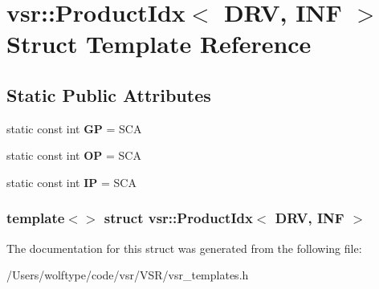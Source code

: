 \hypertarget{structvsr_1_1_product_idx_3_01_d_r_v_00_01_i_n_f_01_4}{\section{vsr\-:\-:Product\-Idx$<$ D\-R\-V, I\-N\-F $>$ Struct Template Reference}
\label{structvsr_1_1_product_idx_3_01_d_r_v_00_01_i_n_f_01_4}
}
\subsection*{Static Public Attributes}
\begin{DoxyCompactItemize}
\item 
\hypertarget{structvsr_1_1_product_idx_3_01_d_r_v_00_01_i_n_f_01_4_ac575700c460ca98326ea71cb839e7f89}{static const int {\bfseries G\-P} = S\-C\-A}\label{structvsr_1_1_product_idx_3_01_d_r_v_00_01_i_n_f_01_4_ac575700c460ca98326ea71cb839e7f89}

\item 
\hypertarget{structvsr_1_1_product_idx_3_01_d_r_v_00_01_i_n_f_01_4_af97c670a5023fd972c28977c0c50e6af}{static const int {\bfseries O\-P} = S\-C\-A}\label{structvsr_1_1_product_idx_3_01_d_r_v_00_01_i_n_f_01_4_af97c670a5023fd972c28977c0c50e6af}

\item 
\hypertarget{structvsr_1_1_product_idx_3_01_d_r_v_00_01_i_n_f_01_4_a9ddf810c00993722a1cc76f6b0e93ac7}{static const int {\bfseries I\-P} = S\-C\-A}\label{structvsr_1_1_product_idx_3_01_d_r_v_00_01_i_n_f_01_4_a9ddf810c00993722a1cc76f6b0e93ac7}

\end{DoxyCompactItemize}
\subsubsection*{template$<$$>$ struct vsr\-::\-Product\-Idx$<$ D\-R\-V, I\-N\-F $>$}



The documentation for this struct was generated from the following file\-:\begin{DoxyCompactItemize}
\item 
/\-Users/wolftype/code/vsr/\-V\-S\-R/vsr\-\_\-templates.\-h\end{DoxyCompactItemize}
